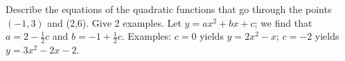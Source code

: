 {Describe the equations of the quadratic functions that go through the points $(-1,3)$ and (2,6). Give 2 examples.}
{Let $y = ax^2+bx+c$; we find that $a = 2-\frac12 c$ and $b = -1+\frac12c$. Examples: $c=0$ yields $y = 2x^2-x$; $c=-2$ yields $y=3x^2-2x-2$.
}
